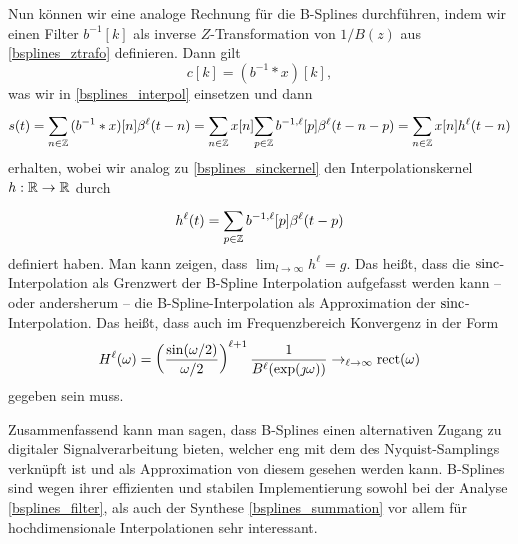 Nun k\"onnen wir eine analoge Rechnung f\"ur die B-Splines durchf\"uhren, indem wir einen Filter $b^{-1}[k]$ als inverse $Z$-Transformation von $1/B(z)$ aus \eqref{bsplines_ztrafo} definieren. Dann gilt
\begin{equation}
    c[k] = (b^{-1} \ast x)[k],
\end{equation}
was wir in \eqref{bsplines_interpol} einsetzen und dann
\begin{equation}
    s(t) = {\sum\limits_{n \in \mathbb{Z}}^{}{
        (b^{-1} \ast x)[n] \beta^{\ell}(t - n)
    }} = {\sum\limits_{n \in \mathbb{Z}}^{}{
        x[n] {\sum\limits_{p \in \mathbb{Z}}^{}{
            b^{-1,\ell}[p] \beta^{\ell}(t - n - p)
        }}
    }} = {\sum\limits_{n \in \mathbb{Z}}^{}{
        x[n] h^\ell(t - n)
    }}
\end{equation}
erhalten, wobei wir analog zu \eqref{bsplines_sinckernel} den Interpolationskernel $h: \mathbb{R} \rightarrow \mathbb{R}$ durch
\begin{equation}\label{bsplines_kernel}
    h^\ell(t) = {\sum\limits_{p \in \mathbb{Z}}^{}{
        b^{-1,\ell}[p] \beta^{\ell}(t - p)
    }}
\end{equation}
definiert haben. Man kann zeigen, dass $\lim_{l \rightarrow \infty} h^\ell = g$. Das hei{\ss}t, dass die $\operatorname*{sinc}$-Interpolation als Grenzwert der B-Spline Interpolation aufgefasst werden kann -- oder andersherum -- die B-Spline-Interpolation als Approximation der $\operatorname*{sinc}$-Interpolation. Das hei{\ss}t, dass auch im Frequenzbereich Konvergenz in der Form
\begin{equation}
    H^\ell(\omega) = \left(\frac{\sin(\omega/2)}{\omega/2}\right)^{\ell+1} \frac{1}{B^{\ell}(\exp(\jmath \omega))} \rightarrow_{\ell \rightarrow \infty} \operatorname*{rect}(\omega)
\end{equation} 
gegeben sein muss.

Zusammenfassend kann man sagen, dass B-Splines einen alternativen Zugang zu digitaler Signalverarbeitung bieten, welcher eng mit dem des Nyquist-Samplings verkn\"upft ist und als Approximation von diesem gesehen werden kann. B-Splines sind wegen ihrer effizienten und stabilen Implementierung sowohl bei der Analyse \eqref{bsplines_filter}, als auch der Synthese \eqref{bsplines_summation} vor allem f\"ur hochdimensionale Interpolationen sehr interessant.

